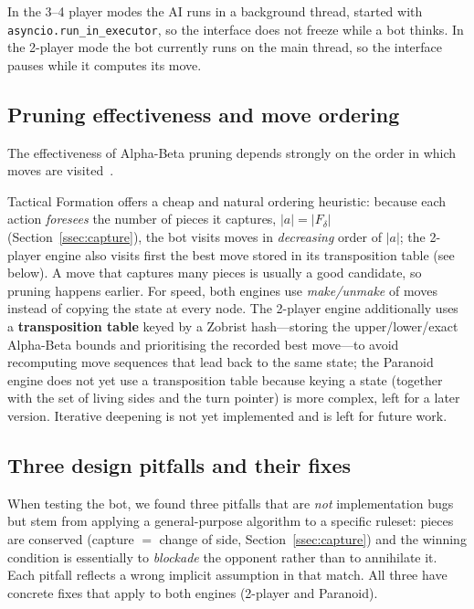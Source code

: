 In the 3--4 player modes the AI runs in a background thread, started with
\texttt{asyncio.run\_in\_executor}, so the interface does not freeze while a
bot thinks. In the 2-player mode the bot currently runs on the main
thread, so the interface pauses while it computes its move.

\subsection{Pruning effectiveness and move ordering}
\label{ssec:ordering}

The effectiveness of Alpha-Beta pruning depends strongly on the order in
which moves are visited~\citep{knuth1975alphabeta}.

Tactical Formation offers a cheap and natural ordering heuristic: because
each action \emph{foresees} the number of pieces it captures,
$|a|=|F_\delta|$ (Section~\ref{ssec:capture}), the bot visits moves in
\emph{decreasing} order of $|a|$; the 2-player engine also visits first the
best move stored in its transposition table (see below). A move that
captures many pieces is usually a good candidate, so pruning happens
earlier. For speed, both engines use \emph{make/unmake} of moves instead of copying the state at every node.
The 2-player engine additionally uses a \textbf{transposition table} keyed
by a Zobrist hash---storing the upper/lower/exact Alpha-Beta bounds and
prioritising the recorded best move---to avoid recomputing move sequences
that lead back to the same state; the Paranoid engine does not yet use a
transposition table because keying a state (together with the set of living
sides and the turn pointer) is more complex, left for a later version.
Iterative deepening is not yet implemented and is left for future work.

\subsection{Three design pitfalls and their fixes}
\label{ssec:pitfalls}

When testing the bot, we found three pitfalls that are \emph{not}
implementation bugs but stem from applying a general-purpose algorithm to a
specific ruleset: pieces are conserved (capture $=$ change of side,
Section~\ref{ssec:capture}) and the winning condition is essentially to
\emph{blockade} the opponent rather than to annihilate it. Each pitfall
reflects a wrong implicit assumption in that match. All three have
concrete fixes that apply to both engines (2-player and Paranoid).

